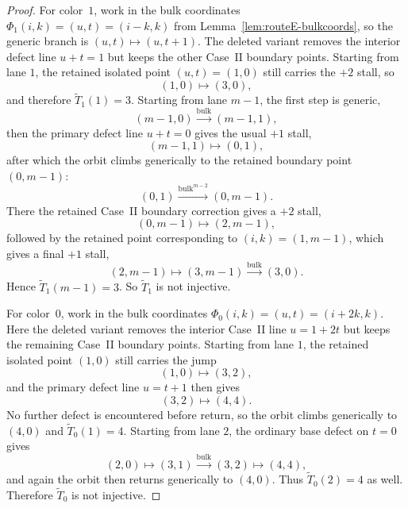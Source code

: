 \documentclass[11pt]{article}
\newcommand{\bulk}{\mathrm{bulk}}   %
\begin{document}
\begin{proof}
For color~$1$, work in the bulk coordinates $\Phi_1(i,k)=(u,t)=(i-k,k)$ from Lemma~\ref{lem:routeE-bulkcoords}, so the generic branch is $(u,t)\mapsto(u,t+1)$.
The deleted variant removes the interior defect line $u+t=1$ but keeps the other Case~II boundary points.
Starting from lane $1$, the retained isolated point $(u,t)=(1,0)$ still carries the $+2$ stall, so
\[
(1,0)\longmapsto(3,0),
\]
and therefore $\widetilde T_1(1)=3$.
Starting from lane $m-1$, the first step is generic,
\[
(m-1,0)\xrightarrow{\bulk}(m-1,1),
\]
then the primary defect line $u+t=0$ gives the usual $+1$ stall,
\[
(m-1,1)\longmapsto(0,1),
\]
after which the orbit climbs generically to the retained boundary point $(0,m-1)$:
\[
(0,1)\xrightarrow{\bulk^{m-2}}(0,m-1).
\]
There the retained Case~II boundary correction gives a $+2$ stall,
\[
(0,m-1)\longmapsto(2,m-1),
\]
followed by the retained point corresponding to $(i,k)=(1,m-1)$, which gives a final $+1$ stall,
\[
(2,m-1)\longmapsto(3,m-1)\xrightarrow{\bulk}(3,0).
\]
Hence $\widetilde T_1(m-1)=3$.
So $\widetilde T_1$ is not injective.

For color~$0$, work in the bulk coordinates $\Phi_0(i,k)=(u,t)=(i+2k,k)$.
Here the deleted variant removes the interior Case~II line $u=1+2t$ but keeps the remaining Case~II boundary points.
Starting from lane $1$, the retained isolated point $(1,0)$ still carries the jump
\[
(1,0)\longmapsto(3,2),
\]
and the primary defect line $u=t+1$ then gives
\[
(3,2)\longmapsto(4,4).
\]
No further defect is encountered before return, so the orbit climbs generically to $(4,0)$ and $\widetilde T_0(1)=4$.
Starting from lane $2$, the ordinary base defect on $t=0$ gives
\[
(2,0)\longmapsto(3,1)\xrightarrow{\bulk}(3,2)\longmapsto(4,4),
\]
and again the orbit then returns generically to $(4,0)$.
Thus $\widetilde T_0(2)=4$ as well.
Therefore $\widetilde T_0$ is not injective.
\end{proof}
\end{document}
